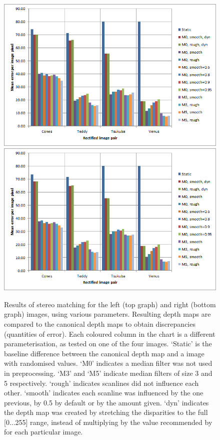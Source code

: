 \begin{figure}[p]
  \centering
  \includegraphics[height=0.4\textheight]{Stereo-left-report}\\[2mm]
  \includegraphics[height=0.4\textheight]{Stereo-right-report}
  \caption[Results of stereo matching]{Results of stereo matching for the left
    (top graph) and right (bottom graph) images, using various parameters.
    Resulting depth maps are compared to the canonical depth maps to obtain
    discrepancies (quantities of error). Each coloured column in the chart is a
    different parameterisation, as tested on one of the four images. `Static' is
    the baseline difference between the canonical depth map and a image with
    randomised values. `M0' indicates a median filter was not used in
    preprocessing. `M3' and `M5' indicate median filters of size 3 and 5
    respectively. `rough' indicates scanlines did not influence each other.
    `smooth' indicates each scanline was influenced by the one previous, by 0.5
    by default or by the amount given. `dyn' indicates the depth map was created
    by stretching the disparities to the full [0...255] range, instead of
    multiplying by the value recommended by \cite{middlebury} for each
    particular image.}
  \label{fig:stereo-report}
\end{figure}

